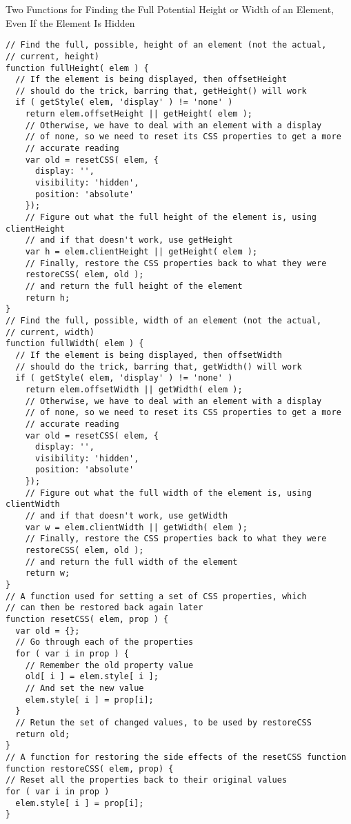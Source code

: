 \documentclass[a4paper,11pt]{book}
\begin{document}
Two Functions for Finding the Full Potential Height or Width of an Element, Even If the Element Is Hidden
\begin{verbatim}
// Find the full, possible, height of an element (not the actual,
// current, height)
function fullHeight( elem ) {
  // If the element is being displayed, then offsetHeight
  // should do the trick, barring that, getHeight() will work
  if ( getStyle( elem, 'display' ) != 'none' )
    return elem.offsetHeight || getHeight( elem );
    // Otherwise, we have to deal with an element with a display
    // of none, so we need to reset its CSS properties to get a more
    // accurate reading
    var old = resetCSS( elem, {
      display: '',
      visibility: 'hidden',
      position: 'absolute'
    });
    // Figure out what the full height of the element is, using clientHeight
    // and if that doesn't work, use getHeight
    var h = elem.clientHeight || getHeight( elem );
    // Finally, restore the CSS properties back to what they were
    restoreCSS( elem, old );
    // and return the full height of the element
    return h;
}
// Find the full, possible, width of an element (not the actual,
// current, width)
function fullWidth( elem ) {
  // If the element is being displayed, then offsetWidth
  // should do the trick, barring that, getWidth() will work
  if ( getStyle( elem, 'display' ) != 'none' )
    return elem.offsetWidth || getWidth( elem );
    // Otherwise, we have to deal with an element with a display
    // of none, so we need to reset its CSS properties to get a more
    // accurate reading
    var old = resetCSS( elem, {
      display: '',
      visibility: 'hidden',
      position: 'absolute'
    });
    // Figure out what the full width of the element is, using clientWidth
    // and if that doesn't work, use getWidth
    var w = elem.clientWidth || getWidth( elem );
    // Finally, restore the CSS properties back to what they were
    restoreCSS( elem, old );
    // and return the full width of the element
    return w;
}
// A function used for setting a set of CSS properties, which
// can then be restored back again later
function resetCSS( elem, prop ) {
  var old = {};
  // Go through each of the properties
  for ( var i in prop ) {
    // Remember the old property value
    old[ i ] = elem.style[ i ];
    // And set the new value
    elem.style[ i ] = prop[i];
  }
  // Retun the set of changed values, to be used by restoreCSS
  return old;
}
// A function for restoring the side effects of the resetCSS function
function restoreCSS( elem, prop) {
// Reset all the properties back to their original values
for ( var i in prop )
  elem.style[ i ] = prop[i];
}
\end{verbatim}
\end{document}

